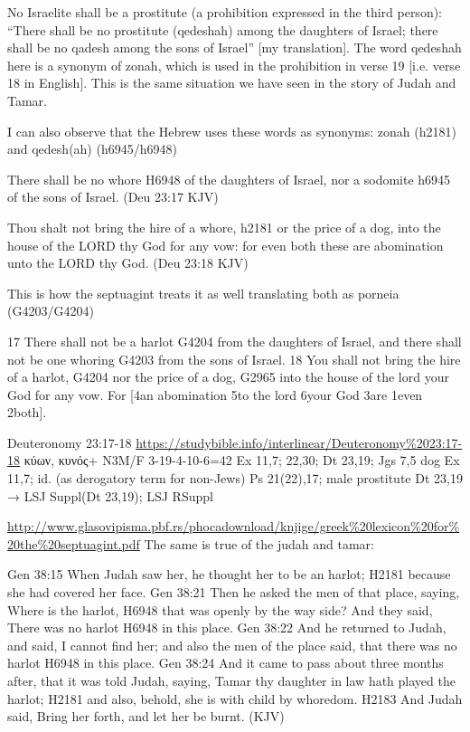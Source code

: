 \documentclass[11pt]{article}
\begin{document}
No Israelite shall be a prostitute (a prohibition expressed in the third person): “There shall be no prostitute (qedeshah) among the daughters of Israel; there shall be no qadesh among the sons of Israel” [my translation]. The word qedeshah here is a synonym of zonah, which is used in the prohibition in verse 19 [i.e. verse 18 in English]. This is the same situation we have seen in the story of Judah and Tamar.

I can also observe that the Hebrew uses these words as synonyms: zonah (h2181) and qedesh(ah) (h6945/h6948)

There shall be no whore H6948 of the daughters of Israel, nor a sodomite h6945 of the sons of Israel. (Deu 23:17 KJV)

Thou shalt not bring the hire of a whore, h2181 or the price of a dog, into the house of the LORD thy God for any vow: for even both these are abomination unto the LORD thy God. (Deu 23:18 KJV)

This is how the septuagint treats it as well translating both as porneia (G4203/G4204)

17 There shall not be a harlot G4204 from the daughters of Israel, and there shall not be one whoring G4203 from the sons of Israel. 18 You shall not bring the hire of a harlot, G4204 nor the price of a dog, G2965 into the house of the lord your God for any vow. For [4an abomination 5to the lord 6your God 3are 1even 2both].

Deuteronomy 23:17-18 \url{https://studybible.info/interlinear/Deuteronomy%2023:17-18}
κύων, κυνός+ N3M/F 3-19-4-10-6=42
Ex 11,7; 22,30; Dt 23,19; Jgs 7,5
dog Ex 11,7; id. (as derogatory term for non-Jews) Ps 21(22),17; male prostitute Dt 23,19 
→ LSJ Suppl(Dt 23,19); LSJ RSuppl 

\url{http://www.glasovipisma.pbf.rs/phocadownload/knjige/greek%20lexicon%20for%20the%20septuagint.pdf}
The same is true of the judah and tamar:

Gen 38:15
When Judah saw her, he thought her to be an harlot; H2181 because she had covered her face.
Gen 38:21
Then he asked the men of that place, saying, Where is the harlot, H6948 that was openly by the way side? And they said, There was no harlot H6948 in this place.
Gen 38:22
And he returned to Judah, and said, I cannot find her; and also the men of the place said, that there was no harlot H6948 in this place.
Gen 38:24
And it came to pass about three months after, that it was told Judah, saying, Tamar thy daughter in law hath played the harlot; H2181 and also, behold, she is with child by whoredom. H2183 And Judah said, Bring her forth, and let her be burnt. (KJV)
\end{document}
